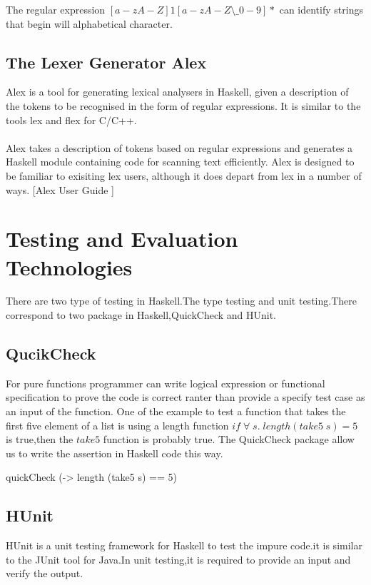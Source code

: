 The regular expression $ [a-zA-Z]{1}[a-zA-Z\setminus\_0-9]*  $ can identify strings that begin will alphabetical character.


\subsection{The Lexer Generator Alex}
Alex is a tool for generating lexical analysers in Haskell, given a description of the tokens to be recognised in the form of regular expressions. It is similar to the tools lex and flex for C/C++.
\\\\
Alex takes a description of tokens based on regular expressions and generates a Haskell module containing code for scanning text efficiently. Alex is designed to be familiar to exisiting lex users, although it does depart from lex in a number of ways.
[Alex User Guide  ]

\section{Testing and Evaluation Technologies}
There are two type of testing in Haskell.The type testing and unit testing.There correspond to two package in Haskell,QuickCheck and HUnit.
\subsection*{QucikCheck}
For pure functions programmer can write logical expression or functional specification to prove the code is correct ranter than provide a specify test case as an input of the function.
One of the example to test a function that takes the first five element of a list is using a length function $ if \;\forall \;s.\; length(take5 \;s) = 5 \;$ is true,then the $take5$ function is probably true.
The QuickCheck package allow us to write the assertion in Haskell code this way.
\begin{hcode}
quickCheck (\s -> length (take5 s) == 5)
\end{hcode}

\subsection*{HUnit}
HUnit is a unit testing framework for Haskell to test the impure code.it is similar to the JUnit tool for Java.In unit testing,it is required to provide an input and verify the output.




